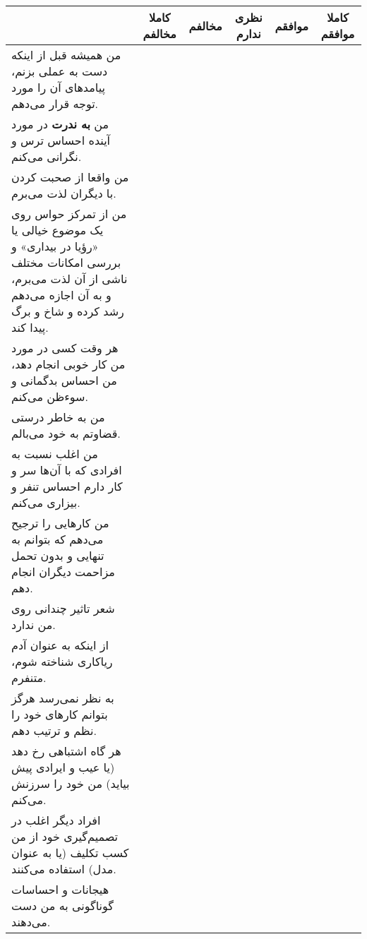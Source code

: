\documentclass[a4paper,10pt]{article}
\begin{document}
\begin{center}
\begin{tabular}{|p{6cm}|c|c|c|c|c|}
\hline
 & کاملا مخالفم & مخالفم & نظری ندارم & موافقم & کاملا موافقم\\
\hline





من همیشه قبل از اینکه دست به عملی بزنم، پیامد‌های آن را مورد توجه قرار می‌دهم.& & & & & \\
\hline

من \textbf{به ندرت} در مورد آینده احساس ترس و نگرانی می‌کنم.& & & & & \\
\hline

من واقعا از صحبت کردن با دیگران لذت می‌برم.& & & & & \\
\hline

من از تمرکز حواس روی یک موضوع خیالی یا «رؤیا در بیداری» و بررسی امکانات مختلف ناشی از آن لذت می‌برم، و به آن اجازه می‌دهم رشد کرده و شاخ و برگ پیدا کند.& & & & & \\
\hline

هر وقت کسی در مورد من کار خوبی انجام دهد، من احساس بدگمانی و سوءظن می‌کنم.& & & & & \\
\hline

من به خاطر درستی قضاوتم به خود می‌بالم.& & & & & \\
\hline

من اغلب نسبت به افرادی که با آن‌ها سر و کار دارم احساس تنفر و بیزاری می‌کنم.& & & & & \\
\hline

من کارهایی را ترجیح می‌دهم که بتوانم به تنهایی و بدون تحمل مزاحمت دیگران انجام دهم.& & & & & \\
\hline

شعر تاثیر چندانی روی من ندارد.& & & & & \\
\hline

از اینکه به عنوان آدم ریاکاری شناخته شوم، متنفرم.& & & & & \\
\hline

به نظر نمی‌رسد هرگز بتوانم کارهای خود را نظم و ترتیب دهم.& & & & & \\
\hline

هر گاه اشتباهی رخ دهد (یا عیب و ایرادی پیش بیاید) من خود را سرزنش می‌کنم.& & & & & \\
\hline

افراد دیگر اغلب در تصمیم‌گیری خود از من کسب تکلیف (یا به عنوان مدل) استفاده می‌کنند.& & & & & \\
\hline

هیجانات و احساسات گوناگونی به من دست می‌دهند.& & & & & \\
\hline



\end{tabular}
\end{center}
\end{document}
